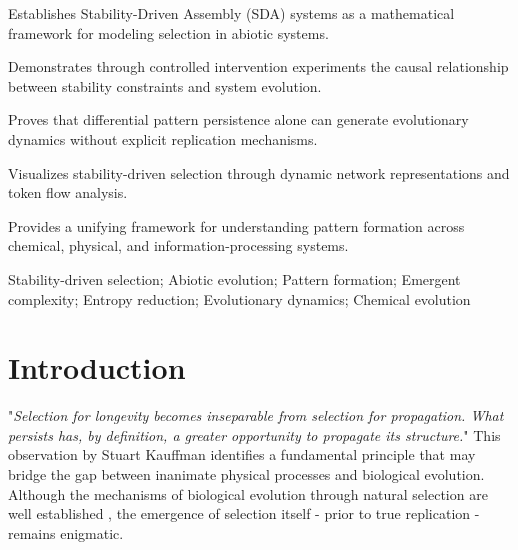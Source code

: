 \documentclass[preprint,12pt]{elsarticle}
\begin{document}
\begin{frontmatter}
\begin{highlights}
\item Establishes Stability-Driven Assembly (SDA) systems as a mathematical framework for modeling selection in abiotic systems.
\item Demonstrates through controlled intervention experiments the causal relationship between stability constraints and system evolution.
\item Proves that differential pattern persistence alone can generate evolutionary dynamics without explicit replication mechanisms.
\item Visualizes stability-driven selection through dynamic network representations and token flow analysis.
\item Provides a unifying framework for understanding pattern formation across chemical, physical, and information-processing systems.
\end{highlights}

\begin{keyword}
Stability-driven selection; Abiotic evolution; Pattern formation; Emergent complexity; Entropy reduction; Evolutionary dynamics; Chemical evolution
\end{keyword}




\end{frontmatter}


\section{Introduction}

"\textit{Selection for longevity becomes inseparable from selection for propagation. What persists has, by definition, a greater opportunity to propagate its structure.}" This observation by Stuart Kauffman \cite{kauffman1995home} identifies a fundamental principle that may bridge the gap between inanimate physical processes and biological evolution. Although the mechanisms of biological evolution through natural selection are well established \cite{fisher1930genetical}, the emergence of selection itself - prior to true replication - remains enigmatic.
\end{document}
